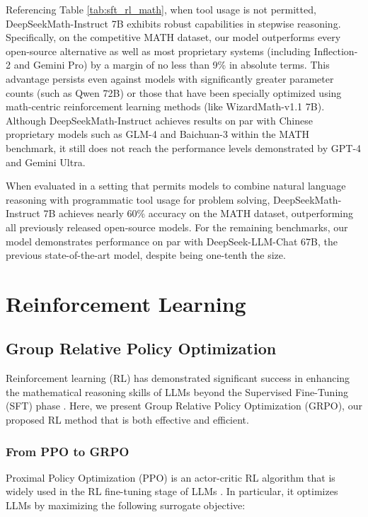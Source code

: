 \begin{itemize}[topsep=0pt]
\begin{itemize}[topsep=0pt]
Referencing Table \ref{tab:sft_rl_math}, when tool usage is not permitted, DeepSeekMath-Instruct 7B exhibits robust capabilities in stepwise reasoning. Specifically, on the competitive MATH dataset, our model outperforms every open-source alternative as well as most proprietary systems (including Inflection-2 and Gemini Pro) by a margin of no less than 9\% in absolute terms. This advantage persists even against models with significantly greater parameter counts (such as Qwen 72B) or those that have been specially optimized using math-centric reinforcement learning methods (like WizardMath-v1.1 7B). Although DeepSeekMath-Instruct achieves results on par with Chinese proprietary models such as GLM-4 and Baichuan-3 within the MATH benchmark, it still does not reach the performance levels demonstrated by GPT-4 and Gemini Ultra.

When evaluated in a setting that permits models to combine natural language reasoning with programmatic tool usage for problem solving, DeepSeekMath-Instruct 7B achieves nearly 60\% accuracy on the MATH dataset, outperforming all previously released open-source models. For the remaining benchmarks, our model demonstrates performance on par with DeepSeek-LLM-Chat 67B, the previous state-of-the-art model, despite being one-tenth the size.  
\section{Reinforcement Learning}

\subsection{Group Relative Policy Optimization} Reinforcement learning (RL) has demonstrated significant success in enhancing the mathematical reasoning skills of LLMs beyond the Supervised Fine-Tuning (SFT) phase \citep{wang2023math,wizardmath}. Here, we present Group Relative Policy Optimization (GRPO), our proposed RL method that is both effective and efficient.

\subsubsection{From PPO to GRPO} Proximal Policy Optimization (PPO) \citep{schulman2017proximal} is an actor-critic RL algorithm that is widely used in the RL fine-tuning stage of LLMs \citep{ouyang2022training}. In particular, it optimizes LLMs by maximizing the following surrogate objective:


\end{itemize}
\end{itemize}
